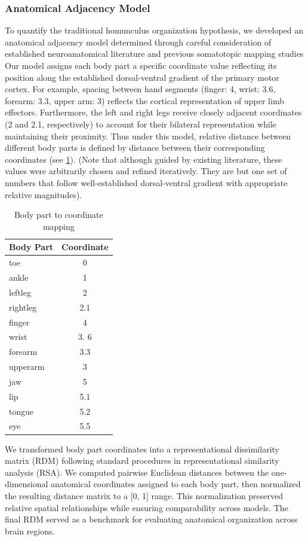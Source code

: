 \documentclass{article}
\begin{document}
\subsubsection{Anatomical Adjacency Model}
To quantify the traditional homunculus organization hypothesis, we developed an anatomical adjacency model determined through careful consideration of established neuroanatomical literature and previous somatotopic mapping studies
Our model assigns each body part a specific coordinate value reflecting its position along the established dorsal-ventral gradient of the primary motor cortex. For example, spacing between hand segments (finger: 4, wrist: 3.6, forearm: 3.3, upper arm: 3) reflects the cortical representation of upper limb effectors. Furthermore, the left and right legs receive closely adjacent coordinates (2 and 2.1, respectively) to account for their bilateral representation while maintaining their proximity. Thus under this model, relative distance between different body parts is defined by distance between their corresponding coordinates (see \ref{tab:coords}). (Note that although guided by existing literature, these values were arbitrarily chosen and refined iteratively. They are but one set of numbers that follow well-established dorsal-ventral gradient with appropriate relative magnitudes). 

\begin{table}[h]
\centering
\begin{tabular}{|l|c|}
\hline
\textbf{Body Part} & \textbf{Coordinate} \\
\hline
toe & 0 \\
ankle & 1 \\
leftleg & 2 \\
rightleg & 2.1 \\
finger & 4 \\
wrist & 3. 6 \\
forearm & 3.3 \\
upperarm & 3 \\
jaw & 5 \\
lip & 5.1 \\
tongue & 5.2 \\
eye & 5.5 \\
\hline
\end{tabular}
\caption{Body part to coordinate mapping}
\label{tab:coords}
\end{table}

We transformed body part coordinates into a representational dissimilarity matrix (RDM) following standard procedures in representational similarity analysis (RSA). We computed pairwise Euclidean distances between the one-dimensional anatomical coordinates assigned to each body part, then normalized the resulting distance matrix to a [0, 1] range. This normalization preserved relative spatial relationships while ensuring comparability across models. The final RDM served as a benchmark for evaluating anatomical organization across brain regions.
\end{document}
